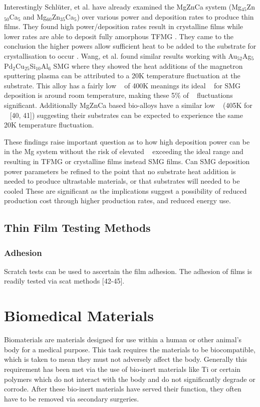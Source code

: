 \documentclass[a4paper,12pt,oneside]{report}%
\begin{document}
Interestingly Schlüter, et al. \cite{Schluter2012} have already examined the MgZnCa system (Mg$_{45}$Zn$_{50}$Ca$_{5}$ and Mg$_{60}$Zn$_{35}$Ca$_{5}$) over various power and deposition rates to produce thin films. They found high power/deposition rates result in crystalline films while lower rates are able to deposit fully amorphous  TFMG \cite{Schluter2012}. They came to the conclusion the higher powers allow sufficient heat to be added to the substrate for crystallisation to occur \cite{Schluter2012}. Wang, et al. \cite{Wang2014} found similar results working with Au$_{52}$Ag$_{5}$Pd$_{2}$Cu$_{25}$Si$_{10}$Al$_{6}$ SMG where they showed the heat additions of the magnetron sputtering plasma can be attributed to a 20K temperature fluctuation at the substrate. This alloy has a fairly low \Tg~ of 400K meanings its ideal \Tsub~ for SMG deposition is around room temperature, making these 5\% of \Tg~ fluctuations significant. Additionally MgZnCa based bio-alloys have a similar low \Tg~ (405K for \MgZnCa~ [40, 41]) suggesting their substrates can be expected to experience the same 20K temperature fluctuation. 

These findings raise important question as to how high deposition power can be in the Mg system without the risk of elevated \Tsub~ exceeding the ideal range and resulting in TFMG or crystalline films instead SMG films. Can SMG deposition power parameters be refined to the point that no substrate heat addition is needed to produce ultrastable materials, or that substrates will needed to be cooled These are significant as the implications suggest a possibility of reduced production cost through higher production rates, and reduced energy use. 
 
\subsection{Thin Film Testing Methods}
\subsubsection{Adhesion}
Scratch tests can be used to ascertain the film adhesion. 
The adhesion of films is readily tested via scat methods [42-45].

\section{Biomedical Materials} 
Biomaterials are materials designed for use within a human or other animal's body for a medical purpose. This task requires the materials to be biocompatible, which is taken to mean they must not adversely affect the body. Generally this requirement has been met via the use of bio-inert materials like Ti or certain polymers which do not interact with the body and do not significantly degrade or corrode. After these bio-inert materials have served their function, they often have to be removed via secondary surgeries.  
\end{document}
